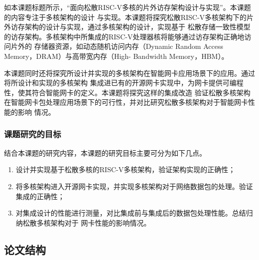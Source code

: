 如本课题标题所示，“面向松散RISC-V多核的片外访存架构设计与实现”。本课题的内容专注于多核架构的设计
与实现。本课题将探究松散RISC-V多核架构下的片外访存架构的设计与实现，通过多核架构的设计，实现基于
松散存储一致性模型的访存架构。多核架构中所集成的RISC-V处理器核将能够通过访存架构正确地访问片外的
存储器资源，如动态随机访问内存（Dynamic Random Access Memory，DRAM）与高带宽内存（High-
Bandwidth Memory，HBM）。

本课题同时还将探究所设计并实现的多核架构在智能网卡应用场景下的应用。通过将所设计和实现的多核架构
集成进已有的开源网卡实现中，为网卡提供可编程性，使其符合智能网卡的定义。本课题将探究这样的集成改造
验证松散多核架构在智能网卡包处理应用场景下的可行性，并对比研究松散多核架构对于智能网卡性能的影响
情况。

\subsubsection{课题研究的目标}



结合本课题的研究内容，本课题的研究目标主要可分为如下几点。

\begin{enumerate}
  \item 设计并实现基于松散多核的RISC-V多核架构，验证架构实现的正确性；
  \item 将多核架构进入开源网卡实现，并实现多核架构对于网络数据包的处理。验证集成的正确性；
  \item 对集成设计的性能进行测量，对比集成前与集成后的数据包处理性能。总结归纳松散多核架构对于
        网卡性能的影响情况。
\end{enumerate}

\subsection{论文结构}

